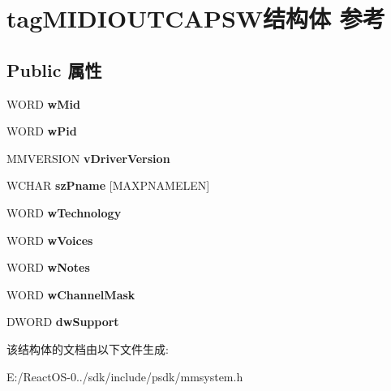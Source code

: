 \hypertarget{structtag_m_i_d_i_o_u_t_c_a_p_s_w}{}\section{tag\+M\+I\+D\+I\+O\+U\+T\+C\+A\+P\+S\+W结构体 参考}
\label{structtag_m_i_d_i_o_u_t_c_a_p_s_w}
\subsection*{Public 属性}
\begin{DoxyCompactItemize}
\item 
\mbox{\label{structtag_m_i_d_i_o_u_t_c_a_p_s_w_aac7a92bd2634773816c46e5ed8657871}} 
W\+O\+RD {\bfseries w\+Mid}
\item 
\mbox{\label{structtag_m_i_d_i_o_u_t_c_a_p_s_w_ab5adee9105ffae81bb8cef43322ab27e}} 
W\+O\+RD {\bfseries w\+Pid}
\item 
\mbox{\label{structtag_m_i_d_i_o_u_t_c_a_p_s_w_a9395d48905b640ce23f002ed64a9114e}} 
M\+M\+V\+E\+R\+S\+I\+ON {\bfseries v\+Driver\+Version}
\item 
\mbox{\label{structtag_m_i_d_i_o_u_t_c_a_p_s_w_ac9da101fe6c8d88cc40d0fd2234ff86b}} 
W\+C\+H\+AR {\bfseries sz\+Pname} \mbox{[}M\+A\+X\+P\+N\+A\+M\+E\+L\+EN\mbox{]}
\item 
\mbox{\label{structtag_m_i_d_i_o_u_t_c_a_p_s_w_abaadd2d5c633cced17d3e1670e54aa26}} 
W\+O\+RD {\bfseries w\+Technology}
\item 
\mbox{\label{structtag_m_i_d_i_o_u_t_c_a_p_s_w_afeaa876f8946bcfdb86a3c22e2179ce4}} 
W\+O\+RD {\bfseries w\+Voices}
\item 
\mbox{\label{structtag_m_i_d_i_o_u_t_c_a_p_s_w_adb07e07fe6072779e8224b60b6c8c58e}} 
W\+O\+RD {\bfseries w\+Notes}
\item 
\mbox{\label{structtag_m_i_d_i_o_u_t_c_a_p_s_w_aaa156ca2404dae349caf3b37bc19ef92}} 
W\+O\+RD {\bfseries w\+Channel\+Mask}
\item 
\mbox{\label{structtag_m_i_d_i_o_u_t_c_a_p_s_w_a4afa104ed1fbfb871e6b14ee3203991e}} 
D\+W\+O\+RD {\bfseries dw\+Support}
\end{DoxyCompactItemize}


该结构体的文档由以下文件生成\+:\begin{DoxyCompactItemize}
\item 
E\+:/\+React\+O\+S-\/0../sdk/include/psdk/mmsystem.\+h\end{DoxyCompactItemize}
